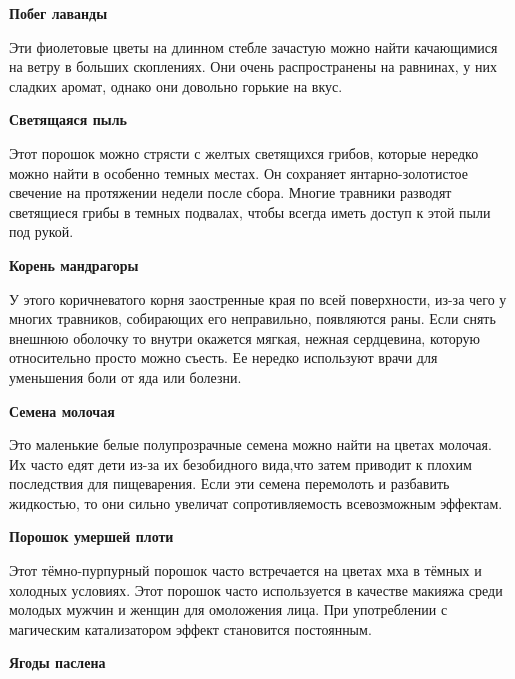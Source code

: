\documentclass[a4paper, 9pt, twocolumn]{book}
\begin{document}
	\medspace
	
	\noindent \textbf{Побег лаванды}
	
	\smallskip
	
	\noindent Эти фиолетовые цветы на длинном стебле зачастую можно найти качающимися на ветру в больших скоплениях. Они очень распространены на равнинах, у них сладких аромат, однако они довольно горькие на вкус.

	\medspace
	
	\noindent \textbf{Светящаяся пыль}
	
	\noindent Этот порошок можно стрясти с желтых светящихся грибов, которые нередко можно найти в особенно темных местах. Он сохраняет янтарно-золотистое свечение на протяжении недели после сбора. Многие травники разводят светящиеся грибы в темных подвалах, чтобы всегда иметь доступ к этой пыли под рукой.
	
	\medspace
	
	\noindent \textbf{Корень мандрагоры}
	
	\smallskip
	
	\noindent  У этого коричневатого корня заостренные края по всей поверхности, из-за чего у многих травников, собирающих его неправильно, появляются раны. Если снять внешнюю оболочку то внутри окажется мягкая, нежная сердцевина, которую относительно просто можно съесть. Ее нередко используют врачи для уменьшения боли от яда или болезни.
	
	\medspace
	
	\noindent \textbf{Семена молочая}
	
	\smallskip
	
	\noindent Это маленькие белые полупрозрачные семена можно найти на цветах молочая. Их часто едят дети из-за их безобидного вида,что затем приводит к плохим последствия для пищеварения. Если эти семена перемолоть и разбавить жидкостью, то они сильно увеличат сопротивляемость всевозможным эффектам.
	
	\medspace
	
	\noindent \textbf{Порошок умершей плоти} %
	
	\smallskip 
	
	\noindent Этот тёмно-пурпурный порошок часто встречается на цветах мха в тёмных и холодных условиях. Этот порошок часто используется в качестве макияжа среди молодых мужчин и женщин для омоложения лица. При употреблении с магическим катализатором эффект становится постоянным.
	
	\medspace
	
	\noindent \textbf{Ягоды паслена}
	
\end{document}
